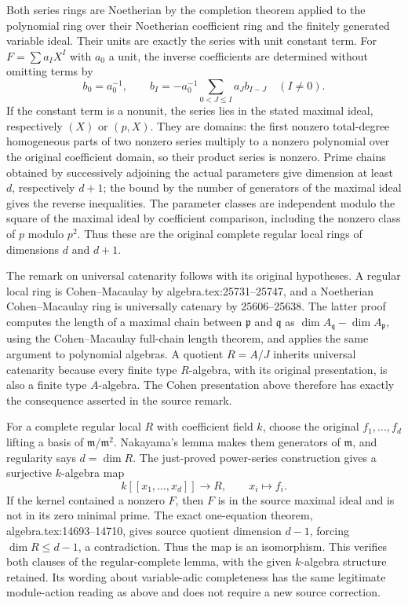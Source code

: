 Both series rings are Noetherian by the completion theorem applied to the polynomial ring over their Noetherian coefficient ring and the finitely generated variable ideal. Their units are exactly the series with unit constant term. For \(F=\sum a_IX^I\) with \(a_0\) a unit, the inverse coefficients are determined without omitting terms by \[
 b_0=a_0^{-1},\qquad
 b_I=-a_0^{-1}\sum_{0<J\leq I}a_Jb_{I-J}\quad(I\ne0).
\] If the constant term is a nonunit, the series lies in the stated maximal ideal, respectively \((X)\) or \((p,X)\). They are domains: the first nonzero total-degree homogeneous parts of two nonzero series multiply to a nonzero polynomial over the original coefficient domain, so their product series is nonzero. Prime chains obtained by successively adjoining the actual parameters give dimension at least \(d\), respectively \(d+1\); the bound by the number of generators of the maximal ideal gives the reverse inequalities. The parameter classes are independent modulo the square of the maximal ideal by coefficient comparison, including the nonzero class of \(p\) modulo \(p^2\). Thus these are the original complete regular local rings of dimensions \(d\) and \(d+1\).

The remark on universal catenarity follows with its original hypotheses. A regular local ring is Cohen--Macaulay by algebra.tex:25731--25747, and a Noetherian Cohen--Macaulay ring is universally catenary by 25606--25638. The latter proof computes the length of a maximal chain between \(\mathfrak p\) and \(\mathfrak q\) as \(\dim A_{\mathfrak q}-\dim A_{\mathfrak p}\), using the Cohen--Macaulay full-chain length theorem, and applies the same argument to polynomial algebras. A quotient \(R=A/J\) inherits universal catenarity because every finite type \(R\)-algebra, with its original presentation, is also a finite type \(A\)-algebra. The Cohen presentation above therefore has exactly the consequence asserted in the source remark.

For a complete regular local \(R\) with coefficient field \(k\), choose the original \(f_1,\ldots,f_d\) lifting a basis of \(\mathfrak m/\mathfrak m^2\). Nakayama's lemma makes them generators of \(\mathfrak m\), and regularity says \(d=\dim R\). The just-proved power-series construction gives a surjective \(k\)-algebra map \[
 k[[x_1,\ldots,x_d]]\longrightarrow R,\qquad x_i\longmapsto f_i.
\] If the kernel contained a nonzero \(F\), then \(F\) is in the source maximal ideal and is not in its zero minimal prime. The exact one-equation theorem, algebra.tex:14693--14710, gives source quotient dimension \(d-1\), forcing \(\dim R\leq d-1\), a contradiction. Thus the map is an isomorphism. This verifies both clauses of the regular-complete lemma, with the given \(k\)-algebra structure retained. Its wording about variable-adic completeness has the same legitimate module-action reading as above and does not require a new source correction.

